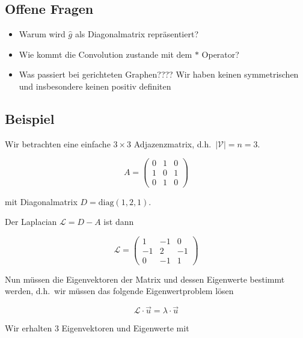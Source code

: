 \subsection{Offene Fragen}

\begin{itemize}
  \item Warum wird $\hat g$ als Diagonalmatrix repräsentiert?
  \item Wie kommt die Convolution zustande mit dem $*$ Operator?
  \item Was passiert bei gerichteten Graphen???? Wir haben keinen symmetrischen und insbesondere keinen positiv definiten
\end{itemize}

\subsection{Beispiel}

Wir betrachten eine einfache $3 \times 3$ Adjazenzmatrix, d.h.\ $|\mathcal{V}| = n = 3$.

\begin{equation}
  A = \begin{pmatrix}
    0 & 1 & 0\\
    1 & 0 & 1\\
    0 & 1 & 0
  \end{pmatrix}
\end{equation}

mit Diagonalmatrix $D = \text{diag}(1, 2, 1)$.

Der Laplacian $\mathcal{L} = D - A$ ist dann

\begin{equation}
  \mathcal{L} = \begin{pmatrix}
    1 & -1 & 0\\
    -1 & 2 & -1\\
    0 & -1 & 1
  \end{pmatrix}
\end{equation}

Nun müssen die Eigenvektoren der Matrix und dessen Eigenwerte bestimmt werden, d.h.\ wir müssen das folgende Eigenwertproblem lösen

\begin{equation}
  \mathcal{L} \cdot \vec{u} = \lambda \cdot \vec{u}
\end{equation}

Wir erhalten $3$ Eigenvektoren und Eigenwerte mit


